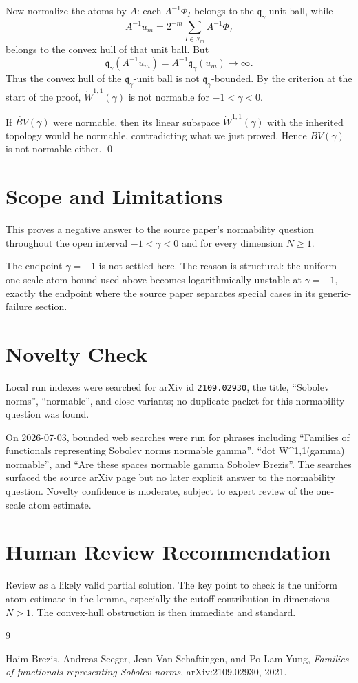 \documentclass[11pt]{article}
\newcommand{\BV}{\dot{BV}}
\newcommand{\Wone}{\dot W^{1,1}}
\newcommand{\qg}{\mathfrak q_\gamma}
\begin{document}
Now normalize the atoms by $A$: each $A^{-1}\Phi_I$ belongs to the $\qg$-unit ball, while
\[
A^{-1}u_m
=2^{-m}\sum_{I\in\mathcal I_m} A^{-1}\Phi_I
\]
belongs to the convex hull of that unit ball. But
\[
\qg(A^{-1}u_m)=A^{-1}\qg(u_m)\to\infty.
\]
Thus the convex hull of the $\qg$-unit ball is not $\qg$-bounded. By the criterion at the start of the proof, $\Wone(\gamma)$ is not normable for $-1<\gamma<0$.

If $\BV(\gamma)$ were normable, then its linear subspace $\Wone(\gamma)$ with the inherited topology would be normable, contradicting what we just proved. Hence $\BV(\gamma)$ is not normable either.
\qed

\section*{Scope and Limitations}

This proves a negative answer to the source paper's normability question throughout the open interval $-1<\gamma<0$ and for every dimension $N\ge1$.

The endpoint $\gamma=-1$ is not settled here. The reason is structural: the uniform one-scale atom bound used above becomes logarithmically unstable at $\gamma=-1$, exactly the endpoint where the source paper separates special cases in its generic-failure section.

\section*{Novelty Check}

Local run indexes were searched for arXiv id \texttt{2109.02930}, the title, ``Sobolev norms'', ``normable'', and close variants; no duplicate packet for this normability question was found.

On 2026-07-03, bounded web searches were run for phrases including ``Families of functionals representing Sobolev norms normable gamma'', ``dot W\string^{1,1}(gamma) normable'', and ``Are these spaces normable gamma Sobolev Brezis''. The searches surfaced the source arXiv page but no later explicit answer to the normability question. Novelty confidence is moderate, subject to expert review of the one-scale atom estimate.

\section*{Human Review Recommendation}

Review as a likely valid partial solution. The key point to check is the uniform atom estimate in the lemma, especially the cutoff contribution in dimensions $N>1$. The convex-hull obstruction is then immediate and standard.

\begin{thebibliography}{9}

Haim Brezis, Andreas Seeger, Jean Van Schaftingen, and Po-Lam Yung,
\emph{Families of functionals representing Sobolev norms},
arXiv:2109.02930, 2021.

\end{thebibliography}
\end{document}
